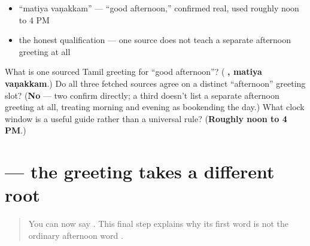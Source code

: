 \begin{itemize}
\raggedright
  \item \textquotedblleft{}matiya vaṇakkam\textquotedblright{} — \textquotedblleft{}good afternoon,\textquotedblright{} confirmed real, used roughly noon to 4 PM
  \item the honest qualification — one source does not teach a separate afternoon greeting at all
\end{itemize}

\begin{tcolorbox}[breakable,colback=teal!4,colframe=teal!35!black,title={Before you move on}]
What is one sourced Tamil greeting for \textquotedblleft{}good afternoon\textquotedblright{}? (\textbf{ , matiya vaṇakkam}.) Do all three fetched sources agree on a distinct \textquotedblleft{}afternoon\textquotedblright{} greeting slot? (\textbf{No} — two confirm   directly; a third doesn't list a separate afternoon greeting at all, treating morning and evening as bookending the day.) What clock window is a useful guide rather than a universal rule? (\textbf{Roughly noon to 4 PM}.)
\end{tcolorbox}
\section[\texorpdfstring{\ta{மதிய} (matiya)}{மதிய (matiya)}]{ — the greeting takes a different root}

\label{lesson:TA-C31-afternoon-greeting-root}



\begin{quote}
You can now say \textbf{ }. This final step explains why its first word is not the ordinary afternoon word \textbf{}.
\end{quote}

